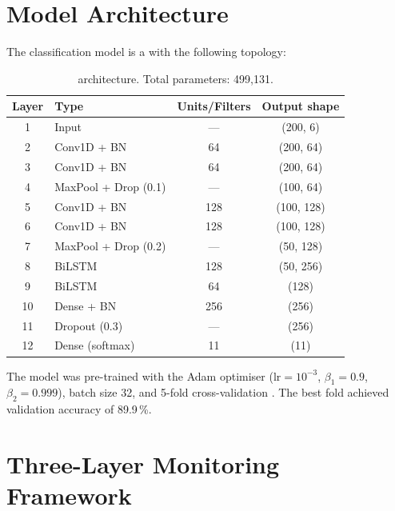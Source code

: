 \section{Model Architecture}
\label{sec:model_architecture}

The classification model is a \cnnbilstm{} with the following topology:

\begin{table}[ht]
  \centering
  \caption{\cnnbilstm{} architecture. Total parameters: 499,131.}
  \label{tab:model_architecture}
  \begin{tabular}{clcc}
    \toprule
    \textbf{Layer} & \textbf{Type} & \textbf{Units/Filters} & \textbf{Output shape} \\
    \midrule
    1  & Input            & ---       & (200, 6) \\
    2  & Conv1D + BN      & 64        & (200, 64) \\
    3  & Conv1D + BN      & 64        & (200, 64) \\
    4  & MaxPool + Drop (0.1)  & ---  & (100, 64) \\
    5  & Conv1D + BN      & 128       & (100, 128) \\
    6  & Conv1D + BN      & 128       & (100, 128) \\
    7  & MaxPool + Drop (0.2)  & ---  & (50, 128) \\
    8  & BiLSTM           & 128       & (50, 256) \\
    9  & BiLSTM           & 64        & (128) \\
    10 & Dense + BN       & 256       & (256) \\
    11 & Dropout (0.3)    & ---       & (256) \\
    12 & Dense (softmax)  & 11        & (11) \\
    \bottomrule
  \end{tabular}
\end{table}

The model was pre-trained with the Adam optimiser \citep{kingma2015adam}
($\text{lr} = 10^{-3}$, $\beta_1 = 0.9$, $\beta_2 = 0.999$),
batch size 32, and 5-fold cross-validation \citep{kohavi1995study}.
The best fold achieved validation accuracy of 89.9\,\%.

\section{Three-Layer Monitoring Framework}
\label{sec:monitoring}

